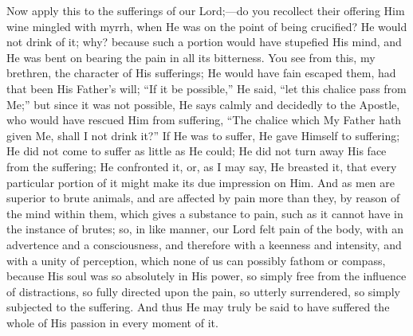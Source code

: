 Now apply this to the sufferings of our Lord;—do you recollect
their offering Him wine mingled with myrrh, when He was on the point
of being crucified? He would not drink of it; why? because such a
portion would have stupefied His mind, and He was bent on bearing the
pain in all its bitterness. You see from this, my brethren, the
character of His sufferings; He would have fain escaped them, had that
been His Father's will; ``If it be possible,'' He said,
``let this chalice pass from Me;'' but since it was not
possible, He says calmly and decidedly to the Apostle, who would have
rescued Him from suffering, ``The chalice which My Father hath
given Me, shall I not drink it?'' If He was to suffer, He gave
Himself to suffering; He did not come to suffer as little as He could;
He did not turn away His face from the suffering; He confronted it,
or, as I may say, He breasted it, that every particular portion of it
might make its due impression on Him. And as men are superior to brute
animals, and are affected by pain more than they, by reason of the
mind within them, which gives a substance to pain, such as it cannot
have in the instance of brutes; so, in like manner, our Lord felt pain
of the body, with an advertence and a consciousness, and therefore
with a keenness and intensity, and with a unity of perception, which
none of us can possibly fathom or compass, because His soul was so
absolutely in His power, so simply free from the influence of
distractions, so fully directed upon the pain, so utterly surrendered,
so simply subjected to the suffering. And thus He may truly be said to
have suffered the whole of His passion in every moment of it.

